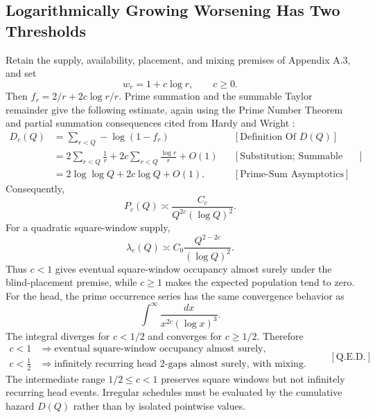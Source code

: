\subsection{Logarithmically Growing Worsening Has Two Thresholds}
Retain the supply, availability, placement, and mixing premises of Appendix A.3, and set
\begin{equation*}
w_r=1+c\log r,
\qquad c\ge0.
\end{equation*}
Then $f_r=2/r+2c\log r/r$. Prime summation and the summable Taylor
remainder give the following estimate, again using the Prime Number
Theorem and partial summation consequences cited from Hardy and Wright
\cite{hardywright2008}:
\begin{equation*}
\begin{aligned}
D_c(Q)
&=\sum_{r < Q}-\log(1-f_r)
&&[\text{Definition Of }D(Q)]\\
&=2\sum_{r < Q}\frac1r
+2c\sum_{r < Q}\frac{\log r}{r}+O(1)
&&[\text{Substitution; Summable Remainder}]\\
&=2\log\log Q+2c\log Q+O(1).
&&[\text{Prime-Sum Asymptotics}]
\end{aligned}
\end{equation*}
Consequently,
\begin{equation*}
P_c(Q)
\asymp
\frac{C_c}{Q^{2c}(\log Q)^2}.
\end{equation*}
For a quadratic square-window supply,
\begin{equation*}
\lambda_c(Q)
\asymp
C_0\frac{Q^{2-2c}}{(\log Q)^2}.
\end{equation*}
Thus $c < 1$ gives eventual square-window occupancy almost surely under the blind-placement premise, while $c\ge1$ makes the expected population tend to zero. For the head, the prime occurrence series has the same convergence behavior as
\begin{equation*}
\int^\infty\frac{dx}{x^{2c}(\log x)^3}.
\end{equation*}
The integral diverges for $c < 1/2$ and converges for $c\ge1/2$. Therefore
\begin{equation*}
\begin{aligned}
c < 1
&\Longrightarrow
\text{eventual square-window occupancy almost surely},\\
c < \frac12
&\Longrightarrow
\text{infinitely recurring head 2-gaps almost surely, with mixing}.
\end{aligned}
\qquad[\text{Q.E.D.}]
\end{equation*}
The intermediate range $1/2\le c < 1$ preserves square windows but not infinitely recurring head events. Irregular schedules must be evaluated by the cumulative hazard $D(Q)$ rather than by isolated pointwise values.
